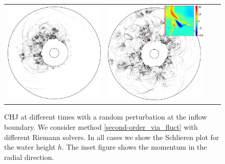 \documentclass[preprint, 11pt]{article}
\begin{document}
\begin{figure}[!h]
{\begin{tabular}{cccc}
      \includegraphics[scale=0.24]{figures/chj_r2wp_blended_t4p0.png} &
      \includegraphics[scale=0.24]{figures/chj_r2wp_blended_t5p0.png}
    \end{tabular}
  }
  \caption{CHJ at different times with a random perturbation at the inflow boundary.
    We consider method \eqref{second-order_via_fluct} with different Riemann solvers. 
    In all cases we show the Schlieren plot for the water height $h$.
    The inset figure shows the momentum in the radial direction.}
\end{figure}
    
\end{document}
